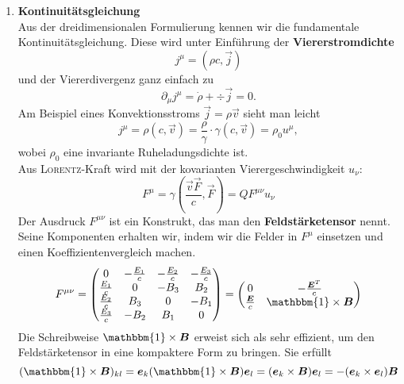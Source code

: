 \begin{enumerate}
\item \textbf{ Kontinuitätsgleichung}\\ 

Aus der dreidimensionalen Formulierung kennen wir die fundamentale Kontinuitätsgleichung. Diese wird unter Einführung der \textbf{Viererstromdichte}
\begin{equation*}
j^\mu  = (\rho c, \vec{j})
\end{equation*}
und der Viererdivergenz ganz einfach zu
\begin{equation*}
\partial_\mu j^\mu = \dot{\rho}+\div\vec{j}= 0 .
\end{equation*}
Am Beispiel eines Konvektionsstroms $\vec{j}=\rho\vec{v}$ sieht man leicht
\begin{equation*}
j^\mu = \rho(c,\vec{v}) = \frac{\rho}{\gamma} \cdot\gamma(c,\vec{v}) = \rho_0 u^\mu,
\end{equation*}
wobei $\rho_0$ eine invariante Ruheladungsdichte ist.\\
Aus \textsc{Lorentz}-Kraft wird mit der kovarianten Vierergeschwindigkeit $u_\nu$:
\begin{equation*}
F^\mu =\gamma\left(\frac{\vec{v}\vec{F}}{c},\vec{F}\right)= QF^{\mu\nu}u_\nu
\end{equation*}
Der Ausdruck $F^{\mu\nu}$ ist ein Konstrukt, das man den \textbf{Feldstärketensor} nennt. Seine Komponenten erhalten wir, indem wir die Felder in $F^\mu$ einsetzen und einen Koeffizientenvergleich machen.
\begin{equation*}
F^{\mu\nu}=\begin{pmatrix}
0 & -\frac{E_1}{c} & -\frac{E_2}{c} & -\frac{E_3}{c}\\
\frac{E_1}{c} & 0 & -B_3 & B_2\\
\frac{E_2}{c} & B_3 & 0 & -B_1\\ 
\frac{E_3}{c} & -B_2 & B_1 & 0
\end{pmatrix} = \begin{pmatrix}
0 & -\frac{\vec{E}^T}{c} \\
\frac{\vec{E}}{c} & \mathbbm{1}\times\vec{B}
\end{pmatrix}
\end{equation*}
Die Schreibweise $\mathbbm{1}\times\vec{B}$ erweist sich als sehr effizient, um den Feldstärketensor in eine kompaktere Form zu bringen. Sie erfüllt
\begin{equation*}
(\mathbbm{1}\times\vec{B})_{kl}=\vec{e}_k(\mathbbm{1}\times\vec{B})\vec{e}_l = (\vec{e}_k\times\vec{B})\vec{e}_l = -(\vec{e}_k\times\vec{e}_l)\vec{B}

\end{equation*}
\end{enumerate}
